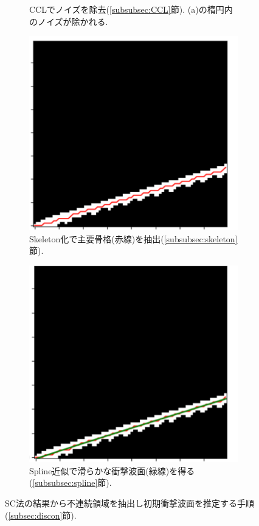 \documentclass[a4j]{jarticle}
\begin{document}
\begin{figure}[H]
\begin{subfigure}[t]{0.23\textwidth}
    \caption{CCLでノイズを除去(\ref{subsubsec:CCL}節). (a)の楕円内のノイズが除かれる.}
  \end{subfigure}
  \begin{subfigure}[t]{0.235\textwidth}
    \centering
    \includegraphics[width=\linewidth]{extractc.pdf}
    \caption{Skeleton化で主要骨格(赤線)を抽出(\ref{subsubsec:skeleton}節).}
  \end{subfigure}
  \hfill
  \begin{subfigure}[t]{0.23\textwidth}
    \centering
    \includegraphics[width=\linewidth]{extractd.pdf}
    \caption{Spline近似で滑らかな衝撃波面(緑線)を得る(\ref{subsubsec:spline}節).}
  \end{subfigure}

  \caption{SC法の結果から不連続領域を抽出し初期衝撃波面を推定する手順(\ref{subsec:discon}節).}
  \label{fig:extract}
\end{figure}
\end{document}
